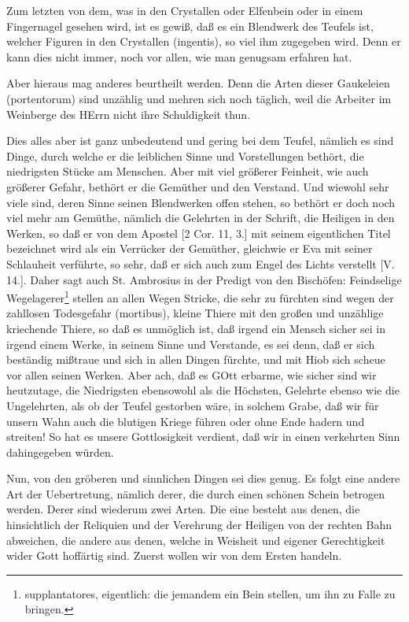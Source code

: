 Zum letzten von dem, was in den Crystallen oder Elfenbein oder in einem Fingernagel gesehen wird, ist es gewiß, daß es ein Blendwerk des Teufels ist, welcher Figuren in den Crystallen (ingentis), so viel ihm zugegeben wird. Denn er kann dies nicht immer, noch vor allen, wie man genugsam erfahren hat.

Aber hieraus mag anderes beurtheilt werden. Denn die Arten dieser Gaukeleien (portentorum) sind unzählig und mehren sich noch täglich, weil die Arbeiter im Weinberge des HErrn nicht ihre Schuldigkeit thun.

Dies alles aber ist ganz unbedeutend und gering bei dem Teufel, nämlich es sind Dinge, durch welche er die leiblichen Sinne und Vorstellungen bethört, die niedrigsten Stücke am Menschen. Aber mit viel größerer Feinheit, wie auch größerer Gefahr, bethört er die Gemüther und den Verstand. Und wiewohl sehr viele sind, deren Sinne seinen Blendwerken offen stehen, so bethört er doch noch viel mehr am Gemüthe, nämlich die Gelehrten in der Schrift, die Heiligen in den Werken, so daß er von dem Apostel [2 Cor. 11, 3.] mit seinem eigentlichen Titel bezeichnet wird als ein Verrücker der Gemüther, gleichwie er Eva mit seiner Schlauheit verführte, so sehr, daß er sich auch zum Engel des Lichts verstellt [V. 14.]. Daher sagt auch St. Ambrosius in der Predigt von den Bischöfen: Feindselige Wegelagerer\footnote{supplantatores, eigentlich: die jemandem ein Bein stellen, um ihn zu Falle zu bringen.} stellen an allen Wegen Stricke, die sehr zu fürchten sind wegen der zahllosen Todesgefahr (mortibus), kleine Thiere mit den großen und unzählige kriechende Thiere, so daß es unmöglich ist, daß irgend ein Mensch sicher sei in irgend einem Werke, in seinem Sinne und Verstande, es sei denn, daß er sich beständig mißtraue und sich in allen Dingen fürchte, und mit Hiob sich scheue vor allen seinen Werken. Aber ach, daß es GOtt erbarme, wie sicher sind wir heutzutage, die Niedrigsten ebensowohl als die Höchsten, Gelehrte ebenso wie die Ungelehrten, als ob der Teufel gestorben wäre, in solchem
Grabe, daß wir für unsern Wahn auch die blutigen Kriege führen oder ohne Ende hadern und streiten! So hat es unsere Gottlosigkeit verdient, daß wir in einen verkehrten Sinn dahingegeben würden.

Nun, von den gröberen und sinnlichen Dingen sei dies genug. Es folgt eine andere Art der Uebertretung, nämlich derer, die durch einen schönen Schein betrogen werden. Derer sind wiederum zwei Arten. Die eine besteht aus denen, die hinsichtlich der Reliquien und der Verehrung der Heiligen von der rechten Bahn abweichen, die andere aus denen, welche in Weisheit und eigener Gerechtigkeit wider Gott hoffärtig sind. Zuerst wollen wir von dem Ersten handeln.

